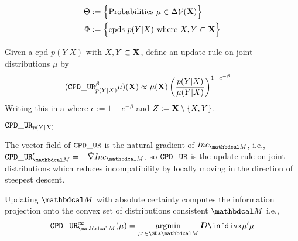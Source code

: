 \documentclass{article}
\begin{document}
\begin{align*}
    \Theta &:=
        \Big\{ 
        \text{Probabilities}~ \mu \in \Delta \mathcal V(\mathbf{X})
        \Big\} \\
    \Phi &:= \Big\{ \text{cpds}~ p(Y|X) 
        \text{ where }  X, Y \subset \mathbf{X} \Big\}
\end{align*}

Given a cpd $p(Y|X)$ with $X,Y \subset \mathbf{X}$, 
define an update rule on joint distributions $\mu$ by 
\begin{align*}
    (\mathtt{CPD\_UR}_{p(Y|X)}^\beta \mu) (\mathbf{X}) &\propto
        \mu(\mathbf{X}) \left(\frac{p(Y|X)}{\mu(Y|X)}\right)^{1 - e^{-\beta}} 
\end{align*}
Writing this in a 
where $\epsilon := 1-e^{-\beta}$ and $Z := \mathbf{X} \setminus \{X,Y\}$.

\begin{prop}
    $\mathtt{CPD\_UR}_{p(Y|X)}$
\end{prop}

\begin{prop}
    The vector field of $\mathtt{CPD\_UR}$ is the natural gradient of $\Inc_{\dg M}$, i.e.,
    $
        \tauur'_{\dg M} = - \hat \nabla \Inc_{\dg M},
    $
    so $\mathtt{CPD\_UR}$ is the update rule on joint distributions which reduces incompatibility by locally moving in the direction of steepest descent.
\end{prop}

\begin{prop}
        Updating $\dg M$ with absolute certainty computes the information projection onto the convex set of distributions consistent $\dg M$ i.e., 
        $$\displaystyle
            \tauur_{\dg M}^\infty(\mu) = \argmin_{\mu' \in \SD*{\dg M}} \kldiv{\mu'}{\mu}
        $$
        
\end{prop}
\end{document}
